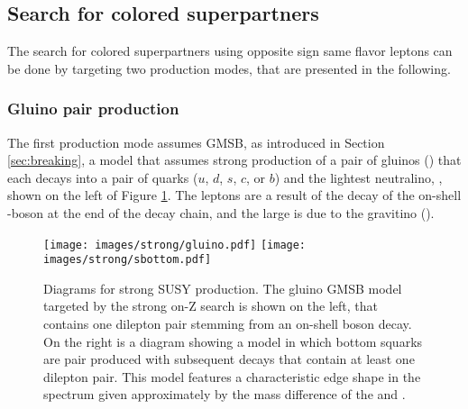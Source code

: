 \subsection*{Search for colored superpartners}\label{sec:searchStrong}
\noindent\justify
The search for colored superpartners using opposite sign same flavor leptons can be done by targeting two production modes, that are presented in the following. 
\subsubsection*{Gluino pair production}
\noindent\justify
The first production mode assumes GMSB, as introduced in Section \ref{sec:breaking}, a model that assumes strong production of a pair of gluinos (\gluino) that each decays into a pair of quarks ($u$, $d$, $s$, $c$, or $b$) and the lightest neutralino, \PSGczDo, shown on the left of Figure \ref{fig:feynmanStrong}. 
The leptons are a result of the decay of the on-shell \PZ-boson at the end of the decay chain, and the large \ptmiss is due to the gravitino (\gravitino). 
\begin{figure}[!htp]
\centering
\texttt{[image: images/strong/gluino.pdf]}
\texttt{[image: images/strong/sbottom.pdf]}
\caption{Diagrams for strong SUSY production. 
The gluino GMSB model targeted by the strong on-Z search is shown on the left, that contains one dilepton pair stemming from an on-shell \PZ boson decay. 
On the right is a diagram showing a model in which bottom squarks are pair produced with subsequent decays that contain at least one dilepton pair. 
This model features a characteristic edge shape in the \mll spectrum given approximately by the mass difference of the \PSGczDt and \PSGczDo.}
\label{fig:feynmanStrong}
\end{figure}                                                                                                                                          
